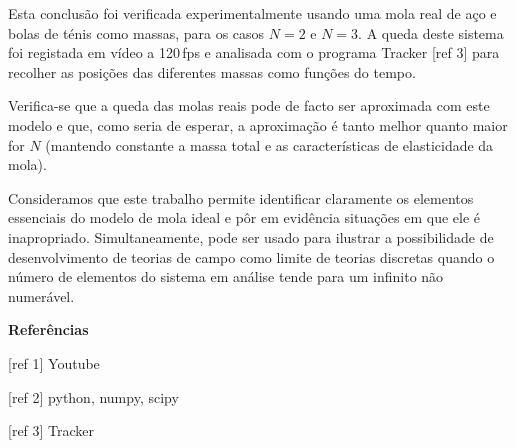 \documentclass{report}
\begin{document}
  Esta conclusão foi verificada experimentalmente usando uma mola real de aço e
  bolas de ténis como massas, para os casos $N=2$ e $N=3$. A queda deste sistema
  foi registada em vídeo a 120\,fps e analisada com o programa Tracker [ref 3]
  para recolher as posições das diferentes massas como funções do tempo.

  Verifica-se que a queda das molas reais pode de facto ser aproximada
  com este modelo e que, como seria de esperar, a aproximação é tanto melhor
  quanto maior for $N$ (mantendo constante a massa total e as características de
  elasticidade da mola). 

  Consideramos que este trabalho permite identificar claramente os elementos
  essenciais do modelo de mola ideal e pôr em evidência situações em que ele é
  inapropriado. Simultaneamente, pode ser usado para ilustrar a possibilidade de
  desenvolvimento de teorias de campo como limite de teorias discretas quando o
  número de elementos do sistema em análise tende para um infinito não
  numerável.

\vspace{.5em}
\textbf{Referências}

[ref 1] Youtube

[ref 2] python, numpy, scipy

[ref 3] Tracker
\end{document}
